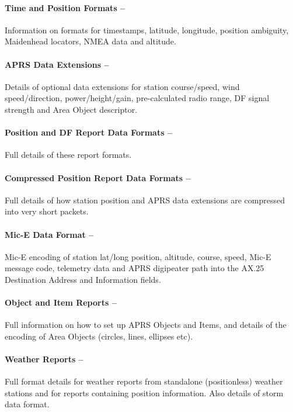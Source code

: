 \paragraph{Time and Position Formats --}Information on formats for timestamps,
latitude, longitude, position ambiguity, Maidenhead locators, NMEA data
and altitude.

\paragraph{APRS Data Extensions --}Details of optional data extensions for station
course/speed, wind speed/direction, power/height/gain, pre-calculated radio
range, DF signal strength and Area Object descriptor.

\paragraph{Position and DF Report Data Formats --}Full details of these report
formats.

\paragraph{Compressed Position Report Data Formats --}Full details of how station
position and APRS data extensions are compressed into very short packets.

\paragraph{Mic-E Data Format --}Mic-E encoding of station lat/long position, altitude,
course, speed, Mic-E message code, telemetry data and APRS digipeater
path into the AX.25 Destination Address and Information fields.

\paragraph{Object and Item Reports --}Full information on how to set up APRS
Objects and Items, and details of the encoding of Area Objects (circles, lines,
ellipses etc).

\paragraph{Weather Reports --}Full format details for weather reports from
standalone (positionless) weather stations and for reports containing
position information. Also details of storm data format.

